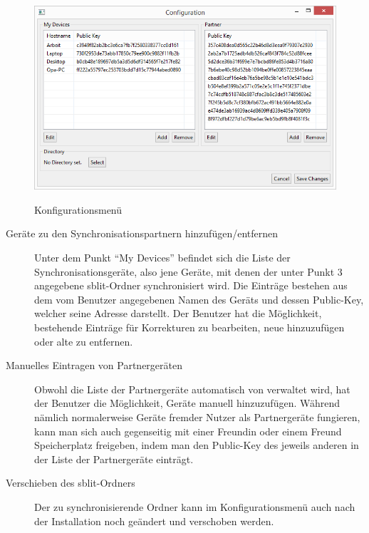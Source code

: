 \begin{figure}[H]
	\centering
	\includegraphics[]{images/config_gui.png}
	\label{config_gui}
  \caption{Konfigurationsmenü}
\end{figure}
\begin{description}

	\item[{Geräte zu den Synchronisationspartnern hinzufügen/entfernen}]
		Unter dem Punkt “My Devices” befindet sich die Liste der
		Synchronisationsgeräte, also jene Geräte, mit denen der unter Punkt 3
		angegebene sblit-Ordner synchronisiert wird. Die Einträge
		bestehen aus dem vom Benutzer angegebenen Namen des Geräts und dessen
		Public-Key, welcher seine Adresse darstellt. Der Benutzer hat die
		Möglichkeit, bestehende Einträge für Korrekturen zu bearbeiten, neue
		hinzuzufügen oder alte zu entfernen.

	\item[{Manuelles Eintragen von Partnergeräten}]
		Obwohl die Liste der Partnergeräte automatisch von \sblit verwaltet wird,
		hat der Benutzer die Möglichkeit, Geräte manuell hinzuzufügen. Während
		nämlich normalerweise Geräte fremder Nutzer als Partnergeräte fungieren,
		kann man sich auch gegenseitig mit einer Freundin oder einem Freund
		Speicherplatz freigeben, indem man den Public-Key des jeweils anderen in der
		Liste der Partnergeräte einträgt.

	\item[{Verschieben des sblit-Ordners}]
		Der zu synchronisierende Ordner kann im Konfigurationsmenü auch nach der
		Installation noch geändert und verschoben werden.

\end{description}

